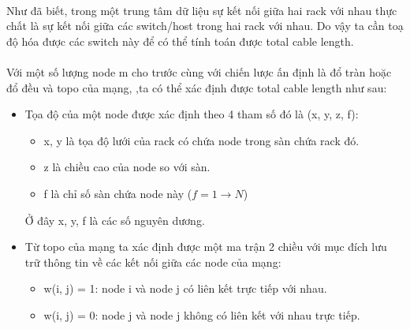 \documentclass[../report.tex]{subfiles}
\begin{document}
\paragraph*{}Như đã biết, trong một trung tâm dữ liệu sự kết nối giữa hai rack với nhau thực chất là sự kết nối giữa các switch/host trong hai rack với nhau. Do vậy ta cần toạ độ hóa được các switch này để có thể tính toán được total cable length.
\paragraph*{} Với một số lượng node m cho trước cùng với chiến lược ấn định là đổ tràn hoặc đổ đều và topo của mạng, ,ta có thể xác định được total cable length như sau:
\begin{itemize}
    \item Tọa độ của một node được xác định theo 4 tham số đó là (x, y, z, f):
        \begin{itemize}
        \item x, y là tọa độ lưới của rack có chứa node trong sàn chứa rack đó.
        \item z là chiều cao của node so với sàn.
        \item f là chỉ số sàn chứa node này ($f = 1 \rightarrow N$)
        \end{itemize}
        Ở đây x, y, f là các số nguyên dương.

    \item Từ topo của mạng ta xác định được một ma trận 2 chiều với mục đích lưu trữ thông tin về các kết nối giữa các node của mạng:
        \begin{itemize}
            \item w(i, j) = 1: node i và node j có liên kết trực tiếp với nhau.
            \item w(i, j) = 0: node j và node j không có liên kết với nhau trực tiếp.
        \end{itemize}


\end{itemize}
\end{document}
